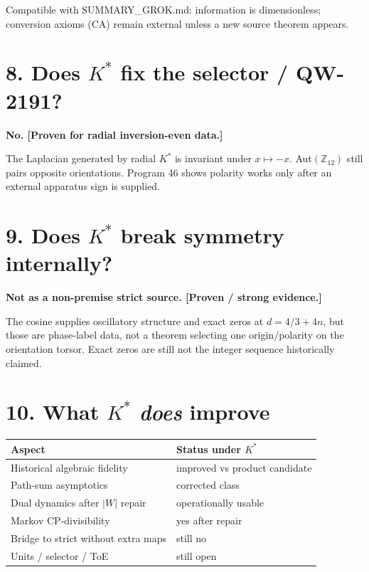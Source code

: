 \documentclass[11pt,a4paper,openany]{report}
\begin{document}
Compatible with SUMMARY\_GROK.md: information is dimensionless; conversion axioms (CA) remain external unless a new source theorem appears.

\section{\texorpdfstring{8. Does \(K^*\) fix the selector /\allowbreak{} QW-2191?}{8. Does K\textasciicircum{}* fix the selector /\allowbreak{} QW-2191?}}

\textbf{No. [Proven for radial inversion-even data.]}

The Laplacian generated by radial \(K^*\) is invariant under \(x\mapsto -x\). Aut\((\mathbb Z_{12})\) still pairs opposite orientations. Program 46 shows polarity works only after an external apparatus sign is supplied.

\section{\texorpdfstring{9. Does \(K^*\) break symmetry internally?}{9. Does K\textasciicircum{}* break symmetry internally?}}

\textbf{Not as a non-premise strict source. [Proven /\allowbreak{} strong evidence.]}

The cosine supplies oscillatory structure and exact zeros at \(d=4/3+4n\), but those are phase-label data, not a theorem selecting one origin/\allowbreak{}polarity on the orientation torsor. Exact zeros are still not the integer sequence historically claimed.

\section{\texorpdfstring{10. What \(K^*\) \emph{does} improve}{10. What K\textasciicircum{}* *does* improve}}

\begin{center}
\begingroup\small
\setlength{\tabcolsep}{3.5pt}
\renewcommand{\arraystretch}{1.16}
\begin{longtable}{@{}p{}p{}@{}}
\toprule
\textbf{Aspect} & \textbf{Status under \(K^*\)} \\
\midrule
\endhead
Historical algebraic fidelity & improved vs product candidate \\
Path-sum asymptotics & corrected class \\
Dual dynamics after \(\lvert W\rvert\) repair & operationally usable \\
Markov CP-divisibility & yes after repair \\
Bridge to strict without extra maps & still no \\
Units /\allowbreak{} selector /\allowbreak{} ToE & still open \\
\bottomrule
\end{longtable}
\endgroup
\end{center}
\end{document}
